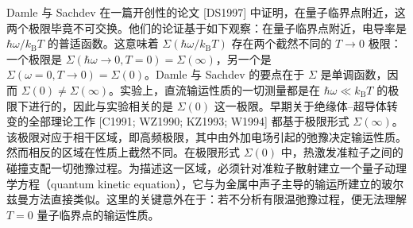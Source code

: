 Damle 与 Sachdev 在一篇开创性的论文 [DS1997] 中证明，在量子临界点附近，这两个极限毕竟不可交换。他们的论证基于如下观察：在量子临界点附近，电导率是 $\hbar\omega/k_{\mathrm{B}}T$ 的普适函数。这意味着 $\Sigma(\hbar\omega/k_{\mathrm{B}}T)$ 存在两个截然不同的 $T\to0$ 极限：一个极限是 $\Sigma(\hbar\omega\to0,T=0)=\Sigma(\infty)$，另一个是 $\Sigma(\omega=0,T\to0)=\Sigma(0)$。Damle 与 Sachdev 的要点在于 $\Sigma$ 是单调函数，因而 $\Sigma(0)\neq\Sigma(\infty)$。实验上，直流输运性质的一切测量都是在 $\hbar\omega\ll k_{\mathrm{B}}T$ 的极限下进行的，因此与实验相关的是 $\Sigma(0)$ 这一极限。早期关于绝缘体–超导体转变的全部理论工作 [C1991; WZ1990; KZ1993; W1994] 都基于极限形式 $\Sigma(\infty)$。该极限对应于相干区域，即高频极限，其中由外加电场引起的弛豫决定输运性质。然而相反的区域在性质上截然不同。在极限形式 $\Sigma(0)$ 中，热激发准粒子之间的碰撞支配一切弛豫过程。为描述这一区域，必须针对准粒子散射建立一个量子动理学方程（quantum kinetic equation），它与为金属中声子主导的输运所建立的玻尔兹曼方法直接类似。这里的关键意外在于：若不分析有限温弛豫过程，便无法理解 $T=0$ 量子临界点的输运性质。


